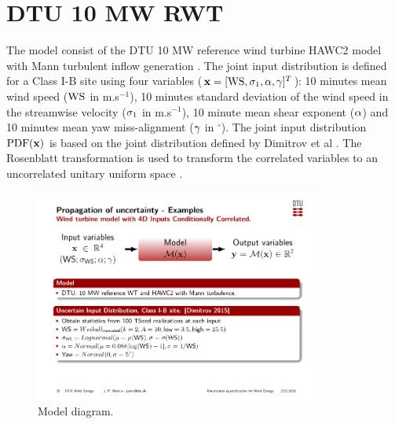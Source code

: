 \documentclass[preprint,12pt]{elsarticle}
\begin{document}
\section{DTU 10 MW RWT}

The model consist of the DTU 10 MW reference wind turbine HAWC2 model \cite{larsen20072, bak2012light} with Mann turbulent inflow generation \cite{Mann1998}. The joint input distribution is defined for a Class I-B site using four variables ($\mathbf{x}=[\text{WS},\sigma_{1},\alpha,\gamma]^T$): 10 minutes mean wind speed ($\text{WS}$ in m.s$^{-1}$), 10 minutes standard deviation of the wind speed in the streamwise velocity ($\sigma_{1}$ in m.s$^{-1}$), 10 minute mean shear exponent ($\alpha$) and 10 minutes mean yaw miss-alignment ($\gamma$ in $^{\circ}$). The joint input distribution $\mathrm{PDF}(\mathbf{x})$ is based on the joint distribution defined by Dimitrov et al \cite{dimitrov2015model}. The Rosenblatt transformation is used to transform the correlated variables to an uncorrelated unitary uniform space \cite{rosenblatt1952}.

\begin{figure}[h!]
\begin{centering}
\includegraphics[width=22pc]{Figures/1_HAWC2_UQ_problem.pdf}
\caption{Model diagram.}
\label{fig_HR_loc}
\end{centering}
\end{figure}

\end{document}

